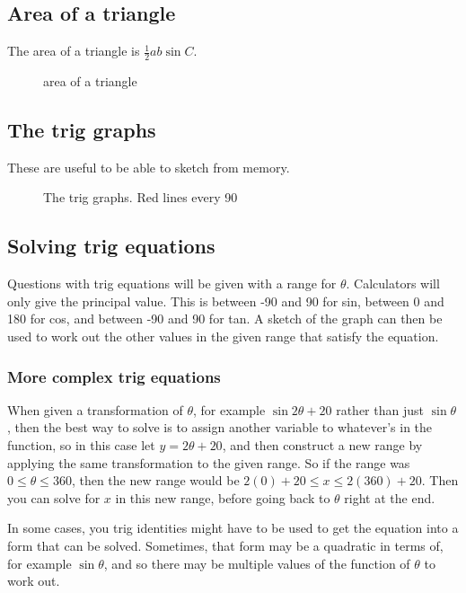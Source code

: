 \subsection{Area of a triangle}
The area of a triangle is $\frac{1}{2}ab\sin{C}$.
\begin{figure}[ht]
    \centering
    \caption{area of a triangle}
    \label{fig:Area-of-a-triangle}
\end{figure}

\subsection{The trig graphs}
These are useful to be able to sketch from memory.
\begin{figure}[ht]
    \centering
    \caption{The trig graphs. Red lines every 90\textdegree}
    \label{fig:the-trig-graphs}
\end{figure}

\subsection{Solving trig equations}
Questions with trig equations will be given with a range for $\theta$. Calculators will only give the principal value. This is between -90 and 90 for sin, between 0 and 180 for cos, and between -90 and 90 for tan. A sketch of the graph can then be used to work out the other values in the given range that satisfy the equation.
\subsubsection{More complex trig equations}
When given a transformation of $\theta$, for example $\sin{2\theta+20}$ rather than just $\sin{\theta}$, then the best way to solve is to assign another variable to whatever's in the function, so in this case let $y=2\theta+20$, and then construct a new range by applying the same transformation to the given range. So if the range was $0\leq\theta\leq360$, then the new range would be $2(0)+20\leq x\leq 2(360)+20$. Then you can solve for $x$ in this new range, before going back to $\theta$ right at the end.

In some cases, you trig identities might have to be used to get the equation into a form that can be solved. Sometimes, that form may be a quadratic in terms of, for example $\sin{\theta}$, and so there may be multiple values of the function of $\theta$ to work out.

